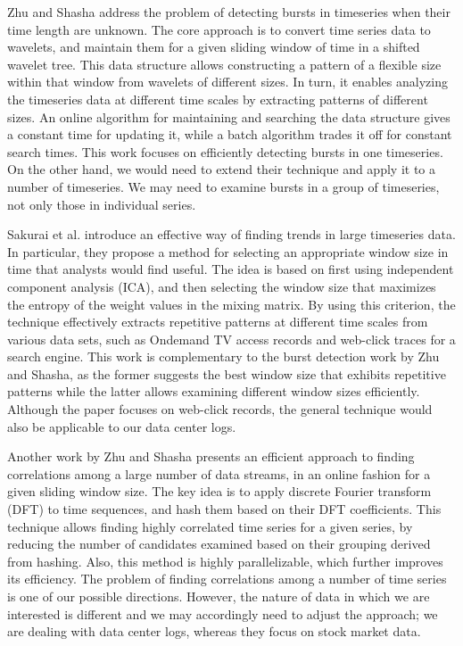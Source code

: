 Zhu and Shasha \cite{Zhu2003} address the problem of detecting bursts in timeseries when their time length are unknown. The core approach is to convert time series data to wavelets, and maintain them  for a given sliding window of time in a shifted wavelet tree. This data structure allows constructing a pattern of a flexible size within that window from wavelets of different sizes. In turn, it enables analyzing the timeseries data at different time scales by extracting patterns of different sizes. An online algorithm for maintaining and searching the data structure gives a constant time for updating it, while a batch algorithm trades it off for constant search times. This work focuses on efficiently detecting bursts in one timeseries. On the other hand, we would need to extend their technique and apply it to a number of timeseries. We may need to examine bursts in a group of timeseries, not only those in individual series.

Sakurai et al. \cite{Sakurai2011} introduce an effective way of finding trends in large timeseries data. In particular, they propose a method for selecting an appropriate window size in time that analysts would find useful. The idea is based on first using independent component analysis (ICA), and then selecting the window size that maximizes the entropy of the weight values in the mixing matrix. By using this criterion, the technique effectively extracts repetitive patterns at different time scales from various data sets, such as Ondemand TV access records and web-click traces for a search engine. This work is complementary to the burst detection work by Zhu and Shasha, as the former suggests the best window size that exhibits repetitive patterns while the latter allows examining different window sizes efficiently. Although the paper focuses on web-click records, the general technique would also be applicable to our data center logs.

Another work by Zhu and Shasha \cite{Zhu2002} presents an efficient approach to finding correlations among a large number of data streams, in an online fashion for a given sliding window size. The key idea is to apply discrete Fourier transform (DFT) to time sequences, and hash them based on their DFT coefficients. This technique allows finding highly correlated time series for a given series, by reducing the number of candidates examined based on their grouping derived from hashing. Also, this method is highly parallelizable, which further improves its efficiency. The problem of finding correlations among a number of time series is one of our possible directions. However, the nature of data in which we are interested is different and we may accordingly need to adjust the approach; we are dealing with data center logs, whereas they focus on stock market data.

